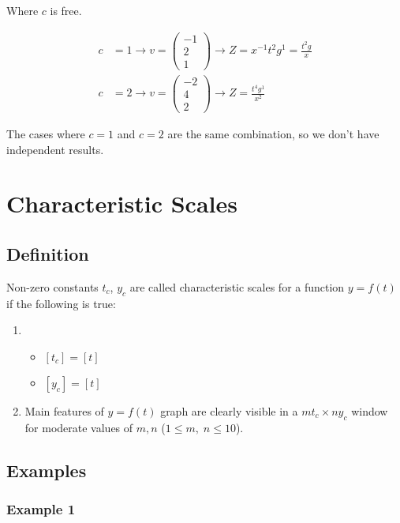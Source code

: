 \documentclass[12pt]{article}
\begin{document}
  Where $c$ is free.

\begin{equation}
  \begin{aligned}
    c &= 1 \rightarrow v =
    \begin{pmatrix}
      -1 \\ 2 \\ 1
    \end{pmatrix} \rightarrow
    Z = x^{-1} t^2 g^1 = \frac{t^2g}{x} \\
    c &= 2 \rightarrow v=
    \begin{pmatrix}
      -2 \\ 4 \\ 2
    \end{pmatrix} \rightarrow
    Z = \frac{t^4g^1}{x^2}
  \end{aligned}
\end{equation}

The cases where $c=1$ and $c=2$ are the same combination, so we don't have
independent results.

\newpage
\section{Characteristic Scales}
\subsection{Definition}
Non-zero constants $t_c$, $y_c$ are called characteristic scales for a function
$y=f(t)$ if the following is true:

\begin{enumerate}
\item \begin{itemize}
\item $[t_c] = [t]$
\item $[y_c] = [t]$
\end{itemize}

\item Main features of $y=f(t)$ graph are clearly visible in a $mt_c \times ny_c$
   window for moderate values of $m,n$ ($1 \le m, \; n \le 10$).
\end{enumerate}

\subsection{Examples}
\subsubsection{Example 1}
\end{document}
